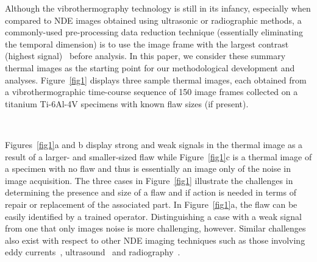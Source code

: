 \documentclass[12pt]{article}
\begin{document}
Although the vibrothermography  technology is still in its infancy,
especially when 
compared to NDE images obtained using ultrasonic or radiographic
methods, a commonly-used pre-processing data reduction technique
(essentially eliminating the temporal dimension) is to use the image
frame with the largest   contrast (highest
signal)~\citep{lietal10,lietal11,gaoandmeeker12} before analysis. In
this paper, we consider these summary thermal images as the starting
point for our methodological development and analyses.
Figure~\ref{fig1} displays three sample thermal  images, each obtained
from a vibrothermographic time-course sequence of 150 image frames
collected on a titanium Ti-6Al-4V specimens with known flaw sizes (if
present). 
\begin{figure*}[h]
\vspace{-0.05in}
\begin{center}
\mbox{
}
\end{center}
\vspace{-0.25in}
\caption{Vibrothermography images on Ti-6Al-4V
  specimens with (a) a single large flaw, (b) a single small flaw and
  (c) no flaws.} 
\label{fig1}
\vspace{-0.15in}
\end{figure*}
Figures~\ref{fig1}a and b display strong and weak signals in the
thermal  image as a result of a larger- and smaller-sized flaw while
Figure~\ref{fig1}c is a thermal  image of a specimen with no flaw and
thus is essentially an image only of the noise in image
acquisition. The three cases in Figure~\ref{fig1}  illustrate the 
challenges in determining the presence and size of a flaw and if
action is needed in terms of repair or replacement of the associated
part. In Figure~\ref{fig1}a, the flaw can be easily identified by a
trained operator. Distinguishing a case with a weak signal 
from one that only images noise is more challenging, however. Similar 
challenges also exist with respect to other NDE imaging
techniques such as those involving eddy currents~\citep{hasanzadehetal08},
ultrasound~\citep[see, {\em e.g.},][]{legendreetal01,ngetal13}
and radiography~\citep{wangandliao02}. 
\end{document}
